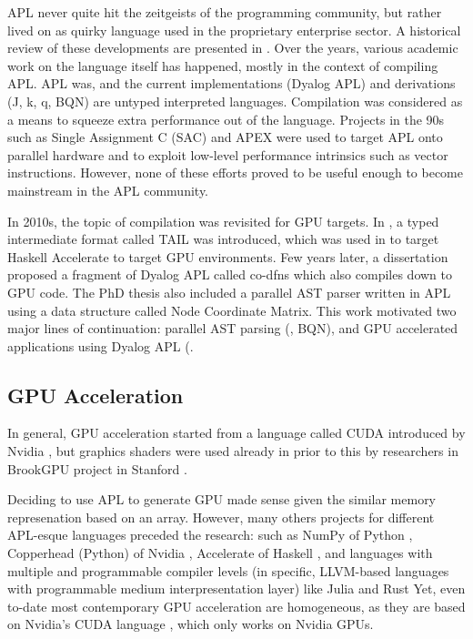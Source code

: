 \documentclass[10pt,a4paper]{article}
\begin{document}
APL never quite hit the zeitgeists of the programming community, but rather lived on as quirky language used in the proprietary enterprise sector.
A historical review of these developments are presented in \cite{AplSince1978HuiR2020}.
Over the years, various academic work on the language itself has happened, mostly in the context of compiling APL.
APL was, and the current implementations (Dyalog APL) and derivations (J, k, q, BQN) are untyped interpreted languages.
Compilation was considered as a means to squeeze extra performance out of the language.
Projects in the 90s such as Single Assignment C (SAC) \cite{SingleAssignmeScholz2003, AcceleratingApGrelck1998} and APEX \cite{ApexTheAplPRobert1997} were used to target APL onto parallel hardware and to exploit low-level performance intrinsics such as vector instructions.
However, none of these efforts proved to be useful enough to become mainstream in the APL community.

In 2010s, the topic of compilation was revisited for GPU targets.
In \cite{CompilingASubElsman2014}, a typed intermediate format called TAIL was introduced, which was used in  \cite{CompilingAplTBudde2015} to target Haskell Accelerate \cite{AcceleratingHaChakra2011} to target GPU environments.
Few years later, a dissertation \cite{ADataParallelAaron2019} proposed a fragment of Dyalog APL called co-dfns which also compiles down to GPU code.
The PhD thesis also included a parallel AST parser written in APL using a data structure called Node Coordinate Matrix.
This work motivated two major lines of continuation: parallel AST parsing (\cite{CompilationOnVoette2022}, BQN), and GPU accelerated applications using Dyalog APL (\cite{UNetCnnInApHsuA2023, UnleashingGpusHaavis2022}.

\subsection{GPU Acceleration}

In general, GPU acceleration started from a language called CUDA introduced by Nvidia \cite{CudaScalableLuebke2008}, but graphics shaders were used already in prior to this by researchers in BrookGPU project in Stanford \cite{AcceleratorTardit2006}.

Deciding to use APL to generate GPU made sense given the similar memory represenation based on an array.
However, many others projects for different APL-esque languages preceded the research: such as NumPy of Python \cite{ArrayProgrammiHarris2020}, Copperhead (Python) of Nvidia \cite{CopperheadCatanz2011}, Accelerate of Haskell \cite{AcceleratingHaChakra2011}, and languages with multiple and programmable compiler levels (in specific, LLVM-based languages with programmable medium interpresentation layer) like Julia \cite{JuliaAFreshBezans2017} and Rust \cite{GpuProgrammingHolk2013}
Yet, even to-date most contemporary GPU acceleration are homogeneous, as they are based on Nvidia's CUDA language \cite{CudaScalableLuebke2008}, which only works on Nvidia GPUs.
\end{document}

